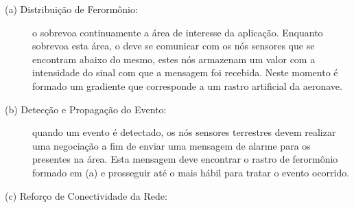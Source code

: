 \begin{description}

	\item[ (a) Distribuição de Ferormônio: ] o \vant sobrevoa continuamente
a área de interesse da aplicação. Enquanto sobrevoa esta área, o \vant deve se
comunicar com os nós sensores que se encontram abaixo do mesmo, estes nós
armazenam um valor com a intensidade do sinal com que a mensagem foi recebida.
Neste momento é formado um gradiente que corresponde a um rastro artificial da aeronave.

	\item[ (b) Detecção e Propagação do Evento:] quando um evento é
detectado, os nós sensores terrestres devem realizar uma negociação a fim de
enviar uma mensagem de alarme para os \vants presentes na área. Esta mensagem
deve encontrar o rastro de ferormônio formado em (a) e prosseguir até o \vant
mais hábil para tratar o evento ocorrido.

	\item[ (c) Reforço de Conectividade da Rede:]




\end{description}

